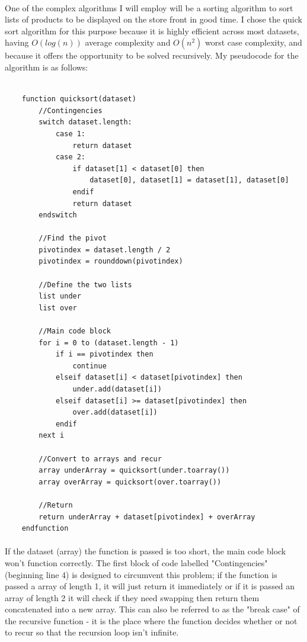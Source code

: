 ﻿\documentclass{article}
\begin{document}
    \paragraph{} One of the complex algorithms I will employ will be a sorting algorithm to sort lists of products to be displayed on the store front in good time.
    I chose the quick sort algorithm for this purpose because it is highly efficient across most datasets, having $O(log(n))$ average complexity and $O(n^2)$ worst case complexity, and because it offers the opportunity to be solved recursively.
    My pseudocode for the algorithm is as follows:
    \begin{lstlisting}[language=psuedocode]

    function quicksort(dataset)
        //Contingencies
        switch dataset.length:
            case 1:
                return dataset
            case 2:
                if dataset[1] < dataset[0] then
                    dataset[0], dataset[1] = dataset[1], dataset[0]
                endif
                return dataset
        endswitch

        //Find the pivot
        pivotindex = dataset.length / 2
        pivotindex = rounddown(pivotindex)

        //Define the two lists
        list under
        list over

        //Main code block
        for i = 0 to (dataset.length - 1)
            if i == pivotindex then
                continue
            elseif dataset[i] < dataset[pivotindex] then
                under.add(dataset[i])
            elseif dataset[i] >= dataset[pivotindex] then
                over.add(dataset[i])
            endif
        next i

        //Convert to arrays and recur
        array underArray = quicksort(under.toarray())
        array overArray = quicksort(over.toarray())
        
        //Return
        return underArray + dataset[pivotindex] + overArray
    endfunction
    \end{lstlisting}
    \paragraph{}
    If the dataset (array) the function is passed is too short, the main code block won't function correctly.
    The first block of code labelled "Contingencies" (beginning line 4) is designed to circumvent this problem; if the function is passed a array of length 1, it will just return it immediately or if it is passed an array of length 2 it will check if they need swapping then return them concatenated into a new array.
    This can also be referred to as the "break case" of the recursive function - it is the place where the function decides whether or not to recur so that the recursion loop isn't infinite.
\end{document}

